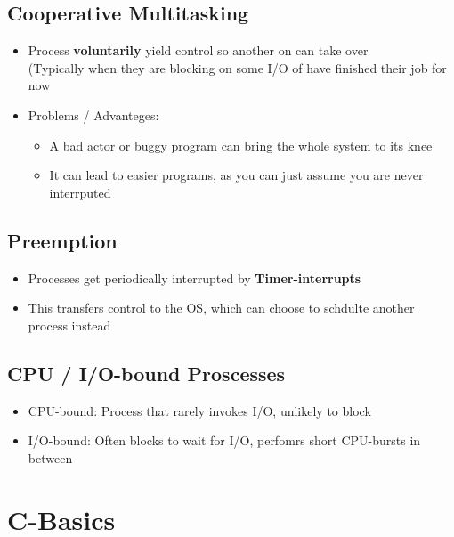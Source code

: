 \documentclass{kit}
\begin{document}
  \subsection{Cooperative Multitasking}
    \begin{itemize}
      \item Process \textbf{voluntarily} yield control so another on can take over\\
        (Typically when they are blocking on some I/O of have finished their job for now
      \item Problems / Advanteges:
        \begin{itemize}
          \item A bad actor or buggy program can bring the whole system to its knee 
          \item It can lead to easier programs, as you can just assume you are never interrputed
        \end{itemize}
    \end{itemize}
    \subsection{Preemption}
      \begin{itemize}
        \item Processes get periodically interrupted by \textbf{Timer-interrupts}
        \item This transfers control to the OS, which can choose to schdulte another process instead
      \end{itemize}
    \subsection{CPU / I/O-bound Proscesses}
      \begin{itemize}
        \item CPU-bound: Process that rarely invokes I/O, unlikely to block
        \item I/O-bound: Often blocks to wait for I/O, perfomrs short CPU-bursts in between
      \end{itemize}


\section{C-Basics}
\end{document}
